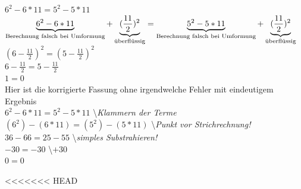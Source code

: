 \documentclass[12pt,a4paper]{article}
\begin{document}
$6^2 - 6 * 11 = 5^2 - 5 * 11$\\
$\underbrace{6^2 - 6 * 11}_{\emph{\emph{Berechnung falsch bei Umformung}}} + \underbrace{(\frac{11}{2})^2}_{\emph{\emph{überflüssig}}} = \underbrace{5^2 - 5 * 11}_{\emph{\emph{Berechnung falsch bei Umformung}}} + \underbrace{(\frac{11}{2})^2}_{\emph{\emph{überflüssig}}}$\\
$(6 - \frac{11}{2})^2 = (5 - \frac{11}{2})^2$\\
$6 - \frac{11}{2} = 5 - \frac{11}{2}$\\
$1 = 0$
\\[2ex]
Hier ist die korrigierte Fassung ohne irgendwelche Fehler mit eindeutigem Ergebnis
\\[2ex]
$6^2 - 6 * 11 = 5^2 - 5 * 11$ \hspace{4cm} \backslash \emph{\emph{Klammern der Terme}}\\ %
$(6^2) - (6 * 11) = (5^2) - (5 * 11)$ \hspace{2.7cm} \backslash \emph{\emph{Punkt vor Strichrechnung!}}\\ %
$36 - 66 = 25 - 55$ \hspace{5.5cm} \backslash \emph{\emph{simples Substrahieren!}}\\ %
$-30 = - 30$ \hspace{6.7cm} \backslash $+ 30$\\ %
$0 = 0$

<<<<<<< HEAD
\end{document}
